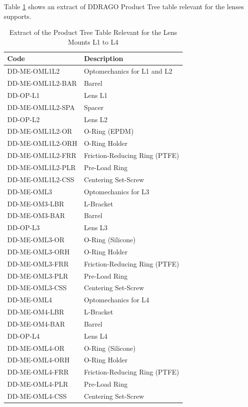 \documentclass{report}
\begin{document}
Table \ref{table:lens-barrel-product-tree} shows an extract of DDRAGO Product Tree table relevant for the lenses supports.

\begin{table}
\caption{Extract of the Product Tree Table Relevant for the Lens Mounts L1 to L4}
\label{table:lens-barrel-product-tree}
\begin{center}
\small
\begin{tabular}{ll}
\hline
\hline
Code                &Description\\
\hline
DD-ME-OML1L2        &Optomechanics for L1 and L2\\
DD-ME-OML1L2-BAR    &Barrel\\
DD-OP-L1            &Lens L1\\
DD-ME-OML1L2-SPA		&Spacer\\
DD-OP-L2            &Lens L2\\
DD-ME-OML1L2-OR		  &O-Ring (EPDM)\\
DD-ME-OML1L2-ORH		&O-Ring Holder\\
DD-ME-OML1L2-FRR		&Friction-Reducing Ring (PTFE)\\
DD-ME-OML1L2-PLR		&Pre-Load Ring\\
DD-ME-OML1L2-CSS		&Centering Set-Screw\\
\hline
DD-ME-OML3          &Optomechanics for L3\\
DD-ME-OM3-LBR       &L-Bracket\\
DD-ME-OM3-BAR       &Barrel\\
DD-OP-L3            &Lens L3\\
DD-ME-OML3-OR		    &O-Ring (Silicone)\\
DD-ME-OML3-ORH	  	&O-Ring Holder\\
DD-ME-OML3-FRR	  	&Friction-Reducing Ring (PTFE)\\
DD-ME-OML3-PLR	  	&Pre-Load Ring\\
DD-ME-OML3-CSS	  	&Centering Set-Screw\\
\hline
DD-ME-OML4          &Optomechanics for L4\\
DD-ME-OM4-LBR       &L-Bracket\\
DD-ME-OM4-BAR       &Barrel\\
DD-OP-L4            &Lens L4\\
DD-ME-OML4-OR	   	  &O-Ring (Silicone)\\
DD-ME-OML4-ORH  		&O-Ring Holder\\
DD-ME-OML4-FRR  		&Friction-Reducing Ring (PTFE)\\
DD-ME-OML4-PLR  		&Pre-Load Ring\\
DD-ME-OML4-CSS	  	&Centering Set-Screw\\
\hline
\end{tabular}
\end{center}
\end{table}
\end{document}
